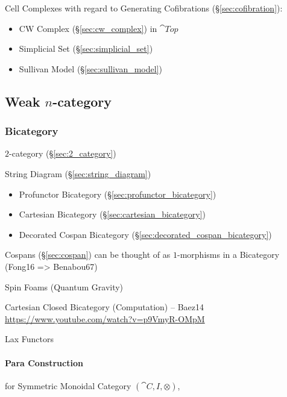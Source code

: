 Cell Complexes with regard to Generating Cofibrations
(\S\ref{sec:cofibration}):
\begin{itemize}
\item CW Complex (\S\ref{sec:cw_complex}) in $\cat{Top}$
\item Simplicial Set (\S\ref{sec:simplicial_set})
\item Sullivan Model (\S\ref{sec:sullivan_model})
\end{itemize}



\subsection{Weak $n$-category}\label{sec:weak_ncategory}

\subsubsection{Bicategory}\label{sec:bicategory}

$2$-category (\S\ref{sec:2_category})

String Diagram (\S\ref{sec:string_diagram})

\begin{itemize}
  \item Profunctor Bicategory (\S\ref{sec:profunctor_bicategory})
  \item Cartesian Bicategory (\S\ref{sec:cartesian_bicategory})
  \item Decorated Cospan Bicategory (\S\ref{sec:decorated_cospan_bicategory})
\end{itemize}

Cospans (\S\ref{sec:cospan}) can be thought of as $1$-morphisms in a Bicategory
(Fong16 => Benabou67)

Spin Foams (Quantum Gravity)

Cartesian Closed Bicategory (Computation) -- Baez14
\url{https://www.youtube.com/watch?v=p9VmyR-OMpM}

Lax Functors



\paragraph{Para Construction}\label{sec:para_construction}\hfill

for Symmetric Monoidal Category $(\cat{C}, I, \otimes)$,


